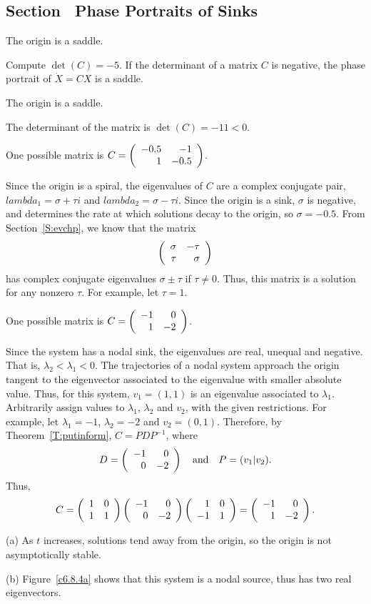 \documentclass{ximera}
\begin{document}
\subsection*{Section~\protect{\ref{S:PlanarSystems}} Phase Portraits of Sinks}

 \ans The origin is a saddle.

\soln Compute $\det(C) = -5$.  If the determinant of a matrix $C$ is
negative, the phase portrait of $\dot{X} = CX$ is a saddle.

 \ans The origin is a saddle.

\soln The determinant of the matrix is $\det(C) = -11 < 0$.

\ans One possible matrix is $C = \left(\begin{array}{rr} -0.5 & -1\\ 1 &-0.5\end{array}\right)$.

\soln Since the origin is a spiral, the eigenvalues of $C$ are a complex
conjugate pair, $lambda_1 = \sigma + \tau i$ and $lambda_2 = \sigma -
\tau i$.  Since the origin is a sink, $\sigma$ is negative, and determines
the rate at which solutions decay to the origin, so $\sigma = -0.5$.
From Section~\ref{S:evchp}, we know that the matrix
\[ \left(\begin{array}{rr} \sigma & -\tau\\ \tau &\sigma\end{array}\right) \]
has complex conjugate eigenvalues $\sigma \pm \tau$ if $\tau \neq 0$.
Thus, this matrix is a solution for any nonzero $\tau$.  For example,
let $\tau = 1$.

\ans One possible matrix is $C = \left(\begin{array}{rr} -1 & 0\\ 1 &-2\end{array}\right)$.

\soln Since the system has a nodal sink, the eigenvalues are real, unequal
and negative.  That is, $\lambda_2 < \lambda_1 < 0$.  The trajectories
of a nodal system approach the origin tangent to the eigenvector
associated to the eigenvalue with smaller absolute value.  Thus, for
this system, $v_1 = (1,1)$ is an eigenvalue associated to $\lambda_1$.
Arbitrarily assign values to $\lambda_1$, $\lambda_2$ and $v_2$, with
the given restrictions.  For example, let $\lambda_1 = -1$, $\lambda_2
= -2$ and $v_2 = (0,1)$.  Therefore, by
Theorem~\ref{T:putinform}, $C = PDP^{-1}$, where
\[ D = \left(\begin{array}{rr} -1 & 0\\ 0 &-2\end{array}\right) \quad\mbox{and}\quad P = (v_1|v_2). \]
Thus,
\[ C = \left(\begin{array}{rr} 1 & 0\\ 1 &1\end{array}\right)\left(\begin{array}{rr} -1 & 0\\ 0 &-2\end{array}\right)\left(\begin{array}{rr} 1 & 0\\ -1 &1\end{array}\right) =
\left(\begin{array}{rr} -1 & 0\\ 1 &-2\end{array}\right). \]

(a) As $t$ increases, solutions tend away from the origin, so the origin
is not asymptotically stable.

(b) Figure~\ref{c6.8.4a} shows that this system is a nodal source,
thus has two real eigenvectors.
\end{document}
